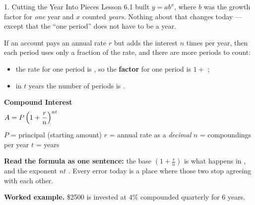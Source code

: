 \documentclass[10pt]{article}
\newcommand{\TallMath}[1]{$\displaystyle #1\rule[-1.4em]{0pt}{3.2em}$}
\begin{document}
\boxguard
\begin{notesbox}{1. Cutting the Year Into Pieces}
Lesson 6.1 built $y=ab^{x}$, where $b$ was the growth factor for \emph{one} year and $x$ counted
\emph{years}. Nothing about that changes today --- except that the ``one period'' does not have to be a
year.

\vspace{4pt}
If an account pays an annual rate $r$ but adds the interest $n$ times per year, then each period uses
only a fraction of the rate, and there are more periods to count:

\vspace{2pt}
\begin{itemize}[leftmargin=1.4em, itemsep=2pt]
  \item the rate for one period is , so the \textbf{factor} for one period is $1+$ ;
  \item in $t$ years the number of periods is .
\end{itemize}

\vspace{4pt}
\begin{center}
\begin{tcolorbox}[colback=goldbg, colframe=goldacc, boxrule=0.8pt, arc=1.5mm, width=0.92\linewidth,
    left=3mm, right=3mm, top=2mm, bottom=2mm]
\centering
\textbf{Compound Interest} \\[3pt]
\TallMath{A = P\left(1+\frac{r}{n}\right)^{nt}}
\\[1pt]
{\small $P$ = principal (starting amount) \quad $r$ = annual rate as a \emph{decimal} \quad
$n$ = compoundings per year \quad $t$ = years}
\end{tcolorbox}
\end{center}

\vspace{2pt}
\textbf{Read the formula as one sentence:} the base $\left(1+\frac{r}{n}\right)$ is what happens in
, and the exponent $nt$ . Every error today is a place where those two stop
agreeing with each other.

\vspace{5pt}
\textbf{Worked example.} \$2500 is invested at $4\%$ compounded quarterly for $6$ years.


\end{notesbox}
\end{document}

